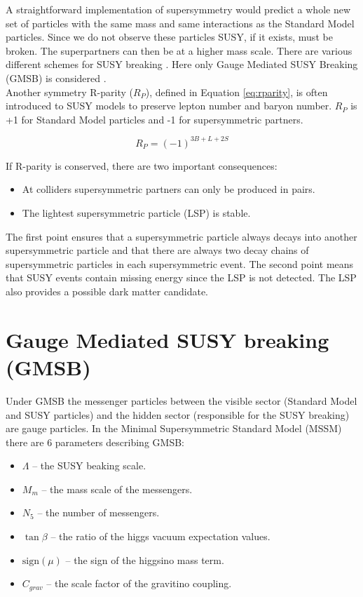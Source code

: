 A straightforward implementation of supersymmetry would predict a whole new set
of particles with the same mass and same interactions as the Standard Model
particles. Since we do not observe these particles SUSY, if it exists, must be 
broken. The superpartners can then be at a higher mass scale. There are various
different schemes for SUSY breaking \cite{aitchison}. Here only Gauge Mediated 
SUSY Breaking (GMSB) is considered \cite{gmsb_at_lhc}. \\

Another symmetry R-parity ($R_{P}$), defined in Equation \ref{eq:rparity}, is 
often introduced to SUSY models to preserve lepton number and baryon number. 
$R_{P}$ is +1 for Standard Model particles and -1 for supersymmetric partners.

\begin{equation}
R_{P} = (-1)^{3B+L+2S}
\label{eq:rparity}
\end{equation}

If R-parity is conserved, there are two important consequences:

\begin{itemize}
\item At colliders supersymmetric partners can only be produced in pairs.
\item The lightest supersymmetric particle (LSP) is stable.
\end{itemize}

The first point ensures that a supersymmetric particle always decays into 
another supersymmetric particle and that there are always two decay chains of 
supersymmetric particles in each supersymmetric event. The second point means 
that SUSY events contain missing energy since the LSP is not detected. The LSP 
also provides a possible dark matter candidate.

\section{Gauge Mediated SUSY breaking (GMSB)}

Under GMSB the messenger particles between the visible sector (Standard Model
and SUSY particles) and the hidden sector (responsible for the SUSY breaking)
are gauge particles. In the Minimal Supersymmetric Standard Model (MSSM) there 
are 6 parameters describing GMSB:

\begin{itemize}
\item $\Lambda$ -- the SUSY beaking scale. 
\item $M_{m}$ -- the mass scale of the messengers.
\item $N_{5}$ -- the number of messengers.
\item $\tan\beta$ -- the ratio of the higgs vacuum expectation values.
\item $\mbox{sign}(\mu)$ -- the sign of the higgsino mass term.
\item $C_{grav}$ -- the scale factor of the gravitino coupling.
\end{itemize}

